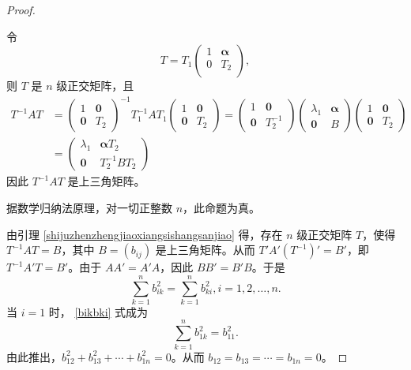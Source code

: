 \begin{enumerate}[1~]
\begin{proof}
\begin{subproof}
令
\[
T = T_1 \left( \begin{matrix}
	1&		\boldsymbol{\boldsymbol{\alpha} }\\
	0&		T_2\\
\end{matrix} \right) ,
\]
则 $T$ 是 $n$ 级正交矩阵，且
\begin{align*}
 T^{-1} A T 
 &=\left( \begin{array}{cc}{1} & {\mathbf{0}} \\ 
 {\mathbf{0}} & {T_{2}}\end{array}\right)^{-1} 
 T_{1}^{-1} A T_{1} 
 \left( \begin{array}{cc}{1} & {\mathbf{0}} \\ 
 {\mathbf{0}} & {T_{2}}\end{array}\right)
 =\left( \begin{array}{cc}{1} & {\mathbf{0}} \\ 
 {\mathbf{0}} & {T_{2}^{-1}}\end{array}\right) 
 \left( \begin{array}{cc}{\lambda_{1}} & {\boldsymbol{\boldsymbol{\alpha}}} \\ 
 {\mathbf{0}} & {B}\end{array}\right) 
 \left( \begin{array}{cc}{1} & {\mathbf{0}} \\ 
 {\mathbf{0}} & {T_{2}}\end{array}\right) \\ 
 &=\left( \begin{array}{cc}{\lambda_{1}} & {\boldsymbol{\boldsymbol{\alpha}} T_{2}} \\ 
 {\mathbf{0}} & {T_{2}^{-1} B T_{2}}\end{array}\right) 
\end{align*}
因此 $T^{-1} A T$ 是上三角矩阵。

据数学归纳法原理，对一切正整数 $n$，此命题为真。
\end{subproof}
由引理 \eqref{shijuzhenzhengjiaoxiangsishangsanjiao} 得，存在 $n$ 级正交矩阵 $T$，使得 $T^{-1} A T = B$，其中 $B = (b_{ij})$ 是上三角矩阵。从而 $T'A'(T^{-1})' = B'$，即 $T^{-1} A' T = B'$。由于 $AA' = A'A$，因此 $BB' = B' B$。于是\begin{equation}\label{bikbki}
\sum_{k = 1}^n  b_{ik}^2 = \sum_{k = 1}^n b_{ki}^2, i = 1, 2, \dots ,n.
\end{equation}
当 $i = 1$ 时， \eqref{bikbki} 式成为\begin{equation*}\label{b1k2b11}
\sum_{k = 1}^n b_{1k}^2 = b_{11}^2.
\end{equation*}
由此推出，$b_{12}^2 + b_{13}^2 + \cdots + b_{1n}^2 = 0$。从而 $b_{12} = b_{13} = \cdots = b_{1n} = 0$。


\end{proof}
\end{enumerate}
